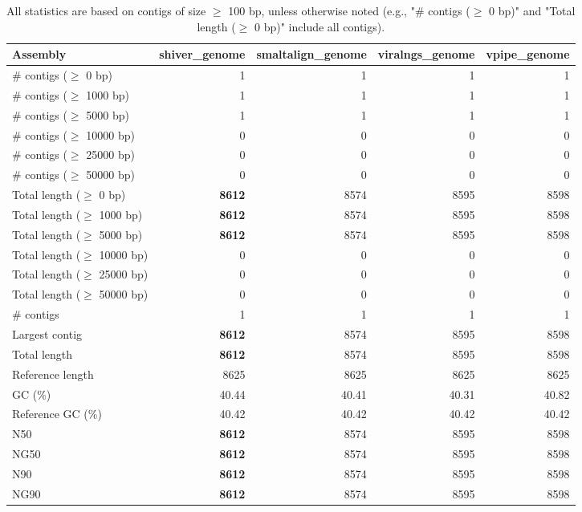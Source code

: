 \documentclass[12pt,a4paper]{article}
\begin{document}
\begin{table}[ht]
\begin{center}
\caption{All statistics are based on contigs of size $\geq$ 100 bp, unless otherwise noted (e.g., "\# contigs ($\geq$ 0 bp)" and "Total length ($\geq$ 0 bp)" include all contigs).}
\begin{tabular}{|l*{4}{|r}|}
\hline
Assembly & shiver\_genome & smaltalign\_genome & viralngs\_genome & vpipe\_genome \\ \hline
\# contigs ($\geq$ 0 bp) & 1 & 1 & 1 & 1 \\ \hline
\# contigs ($\geq$ 1000 bp) & 1 & 1 & 1 & 1 \\ \hline
\# contigs ($\geq$ 5000 bp) & 1 & 1 & 1 & 1 \\ \hline
\# contigs ($\geq$ 10000 bp) & 0 & 0 & 0 & 0 \\ \hline
\# contigs ($\geq$ 25000 bp) & 0 & 0 & 0 & 0 \\ \hline
\# contigs ($\geq$ 50000 bp) & 0 & 0 & 0 & 0 \\ \hline
Total length ($\geq$ 0 bp) & {\bf 8612} & 8574 & 8595 & 8598 \\ \hline
Total length ($\geq$ 1000 bp) & {\bf 8612} & 8574 & 8595 & 8598 \\ \hline
Total length ($\geq$ 5000 bp) & {\bf 8612} & 8574 & 8595 & 8598 \\ \hline
Total length ($\geq$ 10000 bp) & 0 & 0 & 0 & 0 \\ \hline
Total length ($\geq$ 25000 bp) & 0 & 0 & 0 & 0 \\ \hline
Total length ($\geq$ 50000 bp) & 0 & 0 & 0 & 0 \\ \hline
\# contigs & 1 & 1 & 1 & 1 \\ \hline
Largest contig & {\bf 8612} & 8574 & 8595 & 8598 \\ \hline
Total length & {\bf 8612} & 8574 & 8595 & 8598 \\ \hline
Reference length & 8625 & 8625 & 8625 & 8625 \\ \hline
GC (\%) & 40.44 & 40.41 & 40.31 & 40.82 \\ \hline
Reference GC (\%) & 40.42 & 40.42 & 40.42 & 40.42 \\ \hline
N50 & {\bf 8612} & 8574 & 8595 & 8598 \\ \hline
NG50 & {\bf 8612} & 8574 & 8595 & 8598 \\ \hline
N90 & {\bf 8612} & 8574 & 8595 & 8598 \\ \hline
NG90 & {\bf 8612} & 8574 & 8595 & 8598 \\ \hline

\end{tabular}
\end{center}
\end{table}
\end{document}
